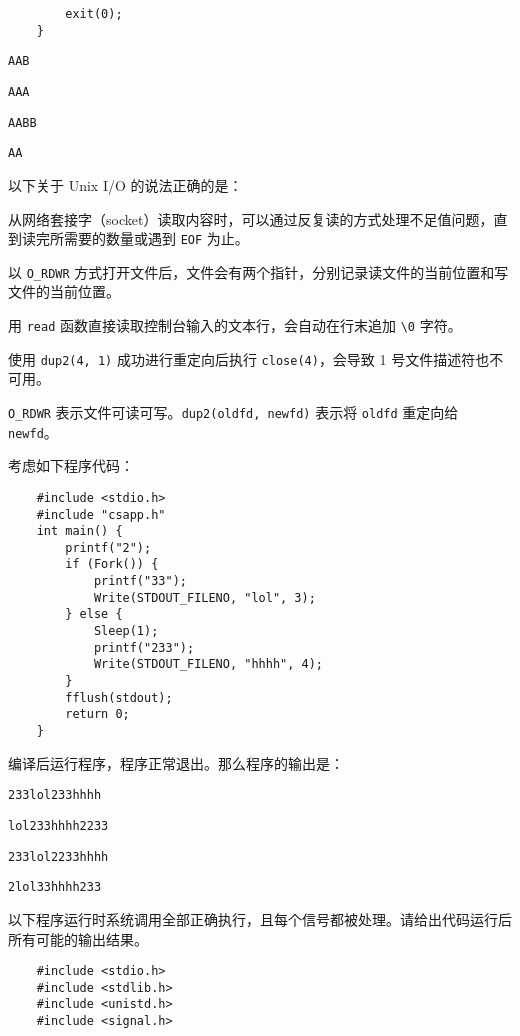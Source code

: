 \begin{problems}
\begin{verbatim}
        exit(0);
    }
        \end{verbatim}
        \begin{choices}
            \item \verb|AAB|
            \item \verb|AAA|
            \item \verb|AABB|
            \item \verb|AA|
        \end{choices}
         以下关于 Unix I/O 的说法正确的是：
        \begin{choices}
            \item 从网络套接字（socket）读取内容时，可以通过反复读的方式处理不足值问题，直到读完所需要的数量或遇到 \verb|EOF| 为止。
            \item 以 \verb|O_RDWR| 方式打开文件后，文件会有两个指针，分别记录读文件的当前位置和写文件的当前位置。
            \item 用 \verb|read| 函数直接读取控制台输入的文本行，会自动在行末追加 \verb|\0| 字符。
            \item 使用 \verb|dup2(4, 1)| 成功进行重定向后执行 \verb|close(4)|，会导致 1 号文件描述符也不可用。
        \end{choices}
        \begin{hint}
            \verb|O_RDWR| 表示文件可读可写。\verb|dup2(oldfd, newfd)| 表示将 \verb|oldfd| 重定向给 \verb|newfd|。
        \end{hint}
         考虑如下程序代码：
        \begin{verbatim}
    #include <stdio.h>
    #include "csapp.h"
    int main() {
        printf("2");
        if (Fork()) {
            printf("33");
            Write(STDOUT_FILENO, "lol", 3);
        } else {
            Sleep(1);
            printf("233");
            Write(STDOUT_FILENO, "hhhh", 4);
        }
        fflush(stdout);
        return 0;
    }
        \end{verbatim}
        编译后运行程序，程序正常退出。那么程序的输出是：
        \begin{choices}
            \item \verb|233lol233hhhh|
            \item \verb|lol233hhhh2233|
            \item \verb|233lol2233hhhh|
            \item \verb|2lol33hhhh233|
        \end{choices}
         以下程序运行时系统调用全部正确执行，且每个信号都被处理。请给出代码运行后所有可能的输出结果。
        \begin{verbatim}
    #include <stdio.h>
    #include <stdlib.h>
    #include <unistd.h>
    #include <signal.h>


\end{verbatim}
\end{problems}
